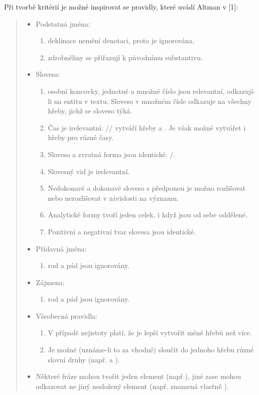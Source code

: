 \documentclass[dp.tex]{subfiles}
\begin{document}
Při tvorbě kritérií je možné inspirovat se pravidly, které uvádí Altman v [1]:
\begin{quote}
\begin{itemize}
\item Podstatná jména:
\begin{enumerate}
\item deklinace nemění denotaci, proto je ignorována,
\item zdrobněliny se přiřazují k původnímu substantivu.
\end{enumerate}
\item Slovesa:
\begin{enumerate}
\item osobní koncovky, jednotné a množné číslo jsou relevantní, odkazují-li na entitu v textu. Sloveso v množném čísle odkazuje na všechny hřeby, jichž se sloveso týká.
\item Čas je irelevantní: // vytváří hřeby  a . Je však možné vytvářet i hřeby pro různé časy.
\item Sloveso a zvratná forma jsou identické: /.
\item Slovesný vid je irelevantní.
\item Nedokonavé a dokonavé sloveso s předponou je možno rozlišovat nebo nerozlišovat v závislosti na významu.
\item Analytické formy tvoří jeden celek, i když jsou od sebe oddělené.
\item Pozitivní a negativní tvar slovesa jsou identické.
\end{enumerate}
\item Přídavná jména:
\begin{enumerate}
\item rod a pád jsou ignorovány.
\end{enumerate}
\item Zájmena:
\begin{enumerate}
\item rod a pád jsou ignorovány.
\end{enumerate}
\item Všeobecná pravidla:
\begin{enumerate}
\item V případě nejistoty platí, že je lepší vytvořit méně hřebů než více.
\item Je možné (uznáme-li to za vhodné) sloučit do jednoho hřebu různé slovní druhy (např.  a ).
\end{enumerate}
\item Některé fráze mohou tvořit jeden element (např.), jiné zase mohou odkazovat ne jiný nesložený element (např.  znamená vlastně ).
\end{itemize}
\end{quote}
\end{document}
